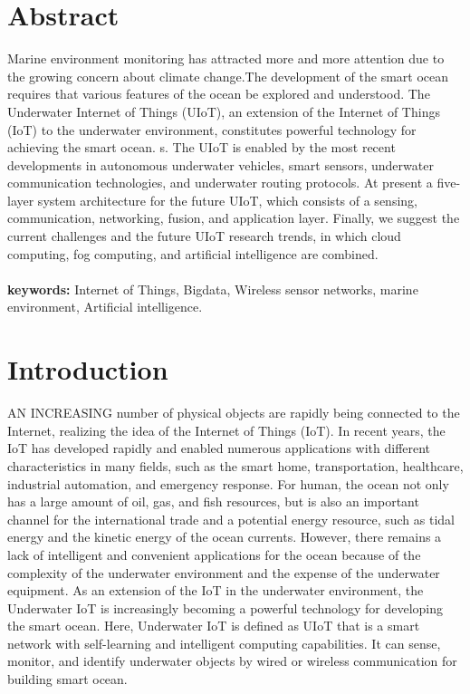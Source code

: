 \documentclass[a4paper,12pt]{article}
\begin{document}
\begin{multicols}{2}
\section{Abstract}
Marine environment monitoring has attracted more and more attention due to the growing concern about climate change.The development of the smart ocean requires that various features of the ocean be explored and understood. The Underwater Internet of Things (UIoT), an extension of the Internet of Things (IoT) to the underwater environment, constitutes powerful technology for achieving the smart ocean. s. The UIoT is enabled by the most recent developments in autonomous underwater vehicles, smart sensors, underwater communication technologies, and underwater routing protocols. At present a five-layer system architecture for the future UIoT, which consists of a sensing, communication, networking, fusion, and application layer. Finally, we suggest the current challenges and the future UIoT research trends, in which cloud computing, fog computing, and artificial intelligence are combined.\\
\\
\textbf{keywords:}
Internet of Things, Bigdata, Wireless sensor networks, marine environment, Artificial intelligence.
\section{Introduction}
AN INCREASING number of physical objects are rapidly being connected to the Internet, realizing the idea of the Internet of Things (IoT). In recent years, the IoT has developed rapidly and enabled numerous applications with different characteristics in many fields, such as the smart home, transportation, healthcare, industrial automation, and emergency response. For human, the ocean not only has a large amount of oil, gas, and fish resources, but is also an important channel for the international trade and a potential energy resource, such as tidal energy and the kinetic energy of the ocean currents. However, there remains a lack of intelligent and convenient applications for the ocean because of the complexity of the underwater environment and the expense of the underwater equipment. As an extension of the IoT in the underwater environment, the Underwater IoT is increasingly becoming a powerful technology for developing the smart ocean. Here, Underwater IoT is defined as UIoT that is a smart network with self-learning and intelligent computing capabilities. It can sense, monitor, and identify underwater objects by wired or wireless communication for building smart ocean.\\


\end{multicols}
\end{document}
